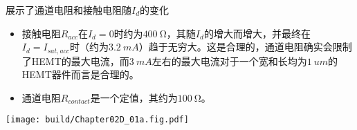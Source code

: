 展示了通道电阻和接触电阻随$I_d$的变化
\begin{itemize}
    \item 接触电阻$R_{acc}$在$I_d=0$时约为$\SI{400}{\ohm}$，其随$I_d$的增大而增大，并最终在$I_d=I_{sat,acc}$时（约为$\SI{3.2}{mA}$）趋于无穷大。这是合理的，通道电阻确实会限制了HEMT的最大电流，而$\SI{3}{mA}$左右的最大电流对于一个宽和长均为$\SI{1}{um}$的HEMT器件而言是合理的。
    \item 通道电阻$R_{contact}$是一个定值，其约为$\SI{100}{\ohm}$。
\end{itemize}
\begin{Figure}[通道电阻和接触电阻]
    \texttt{[image: build/Chapter02D\_01a.fig.pdf]}
\end{Figure}